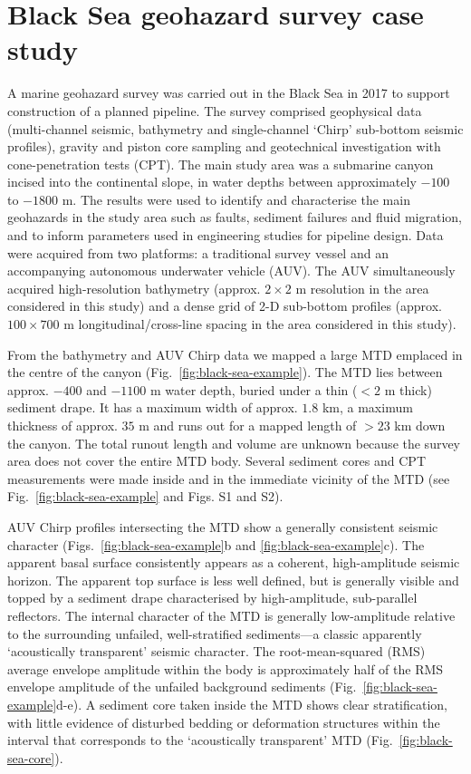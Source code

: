 \documentclass[se,manuscript]{copernicus}
\begin{document}
\section{Black Sea geohazard survey case study}

A marine geohazard survey was carried out in the Black Sea in 2017 to support construction of a planned pipeline.
The survey comprised geophysical data (multi-channel seismic, bathymetry and single-channel `Chirp' sub-bottom seismic profiles), gravity and piston core sampling and geotechnical investigation with cone-penetration tests (CPT).
The main study area was a submarine canyon incised into the continental slope, in water depths between approximately $-100$ to $-1800$ \unit{m}.
The results were used to identify and characterise the main geohazards in the study area such as faults, sediment failures and fluid migration, and to inform parameters used in engineering studies for pipeline design.
Data were acquired from two platforms: a traditional survey vessel and an accompanying autonomous underwater vehicle (AUV).
The AUV simultaneously acquired high-resolution bathymetry (approx. $2\times2$ \unit{m} resolution in the area considered in this study) and a dense grid of 2-D sub-bottom profiles (approx. $100 \times 700$ \unit{m} longitudinal/cross-line spacing in the area considered in this study).

From the bathymetry and AUV Chirp data we mapped a large MTD emplaced in the centre of the canyon (Fig.~\ref{fig:black-sea-example}).
The MTD lies between approx. $-400$ and $-1100$ \unit{m} water depth, buried under a thin ($<2$ \unit{m} thick) sediment drape.
It has a maximum width of approx. $1.8$ \unit{km}, a maximum thickness of approx. $35$ \unit{m} and runs out for a mapped length of $>23$ \unit{km} down the canyon.
The total runout length and volume are unknown because the survey area does not cover the entire MTD body.
Several sediment cores and CPT measurements were made inside and in the immediate vicinity of the MTD (see Fig.~\ref{fig:black-sea-example} and Figs. S1 and S2).

AUV Chirp profiles intersecting the MTD show a generally consistent seismic character (Figs.~\ref{fig:black-sea-example}b and \ref{fig:black-sea-example}c).
The apparent basal surface consistently appears as a coherent, high-amplitude seismic horizon.
The apparent top surface is less well defined, but is generally visible and topped by a sediment drape characterised by high-amplitude, sub-parallel reflectors.
The internal character of the MTD is generally low-amplitude relative to the surrounding unfailed, well-stratified sediments---a classic apparently `acoustically transparent' seismic character.
The root-mean-squared (RMS) average envelope amplitude within the body is approximately half of the RMS envelope amplitude of the unfailed background sediments (Fig.~\ref{fig:black-sea-example}d-e).
A sediment core taken inside the MTD shows clear stratification, with little evidence of disturbed bedding or deformation structures within the interval that corresponds to the `acoustically transparent' MTD (Fig.~\ref{fig:black-sea-core}).
\end{document}
